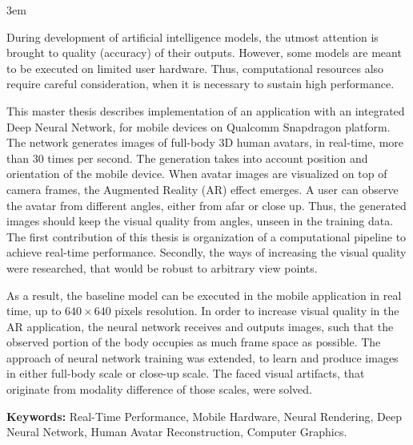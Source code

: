 \emergencystretch 3em

\par
During development of artificial intelligence models, the utmost attention is brought to quality (accuracy) of their outputs. However, some models are meant to be executed on limited user hardware. Thus, computational resources also require careful consideration, when it is necessary to sustain high performance.

\par
This master thesis describes implementation of an application with an integrated Deep Neural Network, for mobile devices on Qualcomm Snapdragon platform. The network generates images of full-body 3D human avatars, in real-time, more than 30 times per second. The generation takes into account position and orientation of the mobile device. When avatar images are visualized on top of camera frames, the Augmented Reality (AR) effect emerges. A user can observe the avatar from different angles, either from afar or close up. Thus, the generated images should keep the visual quality from angles, unseen in the training data. The first contribution of this thesis is organization of a computational pipeline to achieve real-time performance. Secondly, the ways of increasing the visual quality were researched, that would be robust to arbitrary view points.

\par
As a result, the baseline model \cite{dnn:stylepeople21} can be executed in the mobile application in real time, up to $640\times640$ pixels resolution. In order to increase visual quality in the AR application, the neural network receives and outputs images, such that the observed portion of the body occupies as much frame space as possible. The approach of neural network training was extended, to learn and produce images in either full-body scale or close-up scale. The faced visual artifacts, that originate from modality difference of those scales, were solved. 

\par
\textbf{Keywords:} Real-Time Performance, Mobile Hardware, Neural Rendering, Deep Neural Network, Human Avatar Reconstruction, Computer Graphics.  

